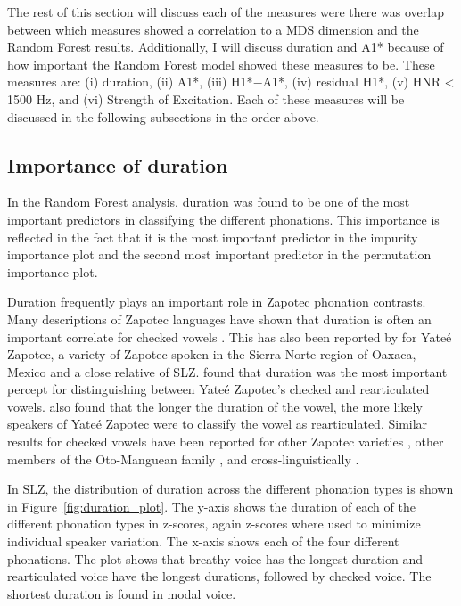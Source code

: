 The rest of this section will discuss each of the measures were there was overlap between which measures showed a correlation to a MDS dimension and the Random Forest results. Additionally, I will discuss duration and A1* because of how important the Random Forest model showed these measures to be. These measures are: (i) duration, (ii) A1*, (iii) H1*$-$A1*, (iv)  residual H1*, (v) HNR < 1500 Hz, and (vi) Strength of Excitation. Each of these measures will be discussed in the following subsections in the order above.

\subsection{Importance of duration} \label{sec:duration_discussion}
In the Random Forest analysis, duration was found to be one of the most important predictors in classifying the different phonations. This importance is reflected in the fact that it is the most important predictor in the impurity importance plot and the second most important predictor in the permutation importance plot. 

Duration frequently plays an important role in Zapotec phonation contrasts. Many descriptions of Zapotec languages have shown that duration is often an important correlate for checked vowels \citep{ariza-garciaPhonationTypesTones2018}. This has also been reported by \citet{chaiPerceptionCheckedRearticulated2025} for Yateé Zapotec, a variety of Zapotec spoken in the Sierra Norte region of Oaxaca, Mexico and a close relative of SLZ. \citet{chaiPerceptionCheckedRearticulated2025} found that duration was the most important percept for distinguishing between Yateé Zapotec's checked and rearticulated vowels. \citeauthor{chaiPerceptionCheckedRearticulated2025} also found that the longer the duration of the vowel, the more likely speakers of Yateé Zapotec were to classify the vowel as rearticulated. Similar results for checked vowels have been reported for other Zapotec varieties \citep{arellanesarellanesSistemaFonologicoPropiedades2009,arellanesarellanesDosGradosLaringizacion2010,chavez-peonInteractionMetricalStructure2010,lopeznicolasEstudiosFonologiaGramatica2016,merrillTilquiapanZapotec2008}, other members of the Oto-Manguean family \citep[e.g.,][]{campbellAspectsPhonologyMorphology2014}, and cross-linguistically \citep{gaoPhonationVariationFunction2022,chaiCheckedSyllablesChecked2022}. 

In SLZ, the distribution of duration across the different phonation types is shown in Figure~\ref{fig:duration_plot}. The y-axis shows the duration of each of the different phonation types in z-scores, again z-scores where used to minimize individual speaker variation. The x-axis shows each of the four different phonations. The plot shows that breathy voice has the longest duration and rearticulated voice have the longest durations, followed by checked voice. The shortest duration is found in modal voice. 

